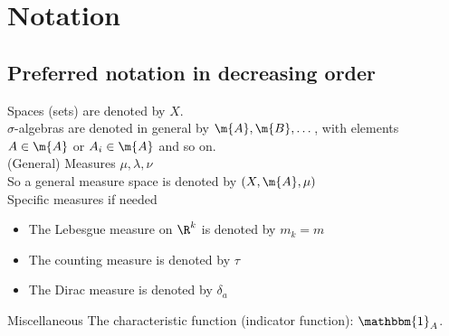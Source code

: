 \section{Notation}
\subsection{Preferred notation in decreasing order}

Spaces (sets) are denoted by $X$.\\

$\sigma$-algebras are denoted in general by
$\m{A}, \m{B}, \dots$, with elements $A\in \m{A}$ or $A_{i}\in \m{A}$ and so on.\\

(General) Measures
$\mu, \lambda, \nu$\\

So a general measure space is denoted by $(X, \m{A}, \mu)$\\

Specific measures if needed
\begin{itemize}
\item The Lebesgue measure on $\R^{k}$ is denoted by $m_{k}=m$
\item The counting measure is denoted by $\tau$
\item The Dirac measure is denoted by $\delta_{a}$\\
\end{itemize}


Miscellaneous
The characteristic function (indicator function):
$\mathbbm{1}_{A}$.
